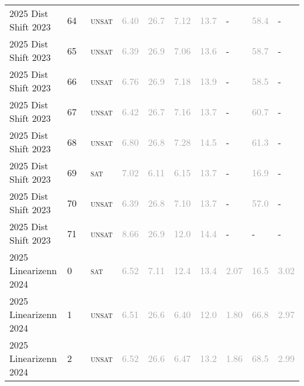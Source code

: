 \begin{center}
{\begin{longtable}{@{}llllllllll@{}}
2025 Dist Shift 2023 & 64 & ~\textsc{unsat} & \textcolor{darkgray}{6.40} & \textcolor{darkgray}{26.7} & \textcolor{darkgray}{7.12} & \textcolor{darkgray}{13.7} & - & \textcolor{darkgray}{58.4} & - \\
2025 Dist Shift 2023 & 65 & ~\textsc{unsat} & \textcolor{darkgray}{6.39} & \textcolor{darkgray}{26.9} & \textcolor{darkgray}{7.06} & \textcolor{darkgray}{13.6} & - & \textcolor{darkgray}{58.7} & - \\
2025 Dist Shift 2023 & 66 & ~\textsc{unsat} & \textcolor{darkgray}{6.76} & \textcolor{darkgray}{26.9} & \textcolor{darkgray}{7.18} & \textcolor{darkgray}{13.9} & - & \textcolor{darkgray}{58.5} & - \\
2025 Dist Shift 2023 & 67 & ~\textsc{unsat} & \textcolor{darkgray}{6.42} & \textcolor{darkgray}{26.7} & \textcolor{darkgray}{7.16} & \textcolor{darkgray}{13.7} & - & \textcolor{darkgray}{60.7} & - \\
2025 Dist Shift 2023 & 68 & ~\textsc{unsat} & \textcolor{darkgray}{6.80} & \textcolor{darkgray}{26.8} & \textcolor{darkgray}{7.28} & \textcolor{darkgray}{14.5} & - & \textcolor{darkgray}{61.3} & - \\
2025 Dist Shift 2023 & 69 & ~\textsc{sat} & \textcolor{darkgray}{7.02} & \textcolor{darkgray}{6.11} & \textcolor{darkgray}{6.15} & \textcolor{darkgray}{13.7} & - & \textcolor{darkgray}{16.9} & - \\
2025 Dist Shift 2023 & 70 & ~\textsc{unsat} & \textcolor{darkgray}{6.39} & \textcolor{darkgray}{26.8} & \textcolor{darkgray}{7.10} & \textcolor{darkgray}{13.7} & - & \textcolor{darkgray}{57.0} & - \\
2025 Dist Shift 2023 & 71 & ~\textsc{unsat} & \textcolor{darkgray}{8.66} & \textcolor{darkgray}{26.9} & \textcolor{darkgray}{12.0} & \textcolor{darkgray}{14.4} & - & - & - \\
\midrule
2025 Linearizenn 2024 & 0 & ~\textsc{sat} & \textcolor{darkgray}{6.52} & \textcolor{darkgray}{7.11} & \textcolor{darkgray}{12.4} & \textcolor{darkgray}{13.4} & \textcolor{darkgray}{2.07} & \textcolor{darkgray}{16.5} & \textcolor{darkgray}{3.02} \\
2025 Linearizenn 2024 & 1 & ~\textsc{unsat} & \textcolor{darkgray}{6.51} & \textcolor{darkgray}{26.6} & \textcolor{darkgray}{6.40} & \textcolor{darkgray}{12.0} & \textcolor{darkgray}{1.80} & \textcolor{darkgray}{66.8} & \textcolor{darkgray}{2.97} \\
2025 Linearizenn 2024 & 2 & ~\textsc{unsat} & \textcolor{darkgray}{6.52} & \textcolor{darkgray}{26.6} & \textcolor{darkgray}{6.47} & \textcolor{darkgray}{13.2} & \textcolor{darkgray}{1.86} & \textcolor{darkgray}{68.5} & \textcolor{darkgray}{2.99} \\

\end{longtable}}
\end{center}
